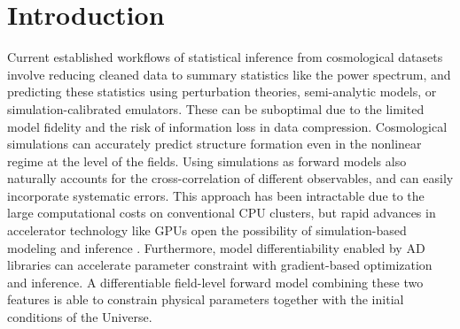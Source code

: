 \documentclass[modern, dvipsnames]{aastex631}
\newcommand{\pmwd}{{\usefont{T1}{nova}{m}{sl}pmwd}}
\begin{document}
\begin{abstract}

Rapid advances in deep learning have brought not only myriad powerful
neural networks, but also breakthroughs that benefit established
scientific research.
In particular, automatic differentiation (AD) tools and computational
accelerators like GPUs have facilitated forward modeling of the Universe
with differentiable simulations.
Based on analytic or automatic backpropagation, current differentiable
cosmological simulations are limited by memory, and thus are subject to
a trade-off between time and space/mass resolution, usually sacrificing
both.
We present a new approach free of such constraints, using the adjoint
method and reverse time integration.
It enables larger and more accurate forward modeling at the field level,
and will improve gradient based optimization and inference.
We implement it in an open-source particle-mesh (PM) $N$-body library
\pmwd\ (particle-mesh with derivatives).
Based on the powerful AD system \texttt{JAX}, \pmwd\ is fully
differentiable, and is highly performant on GPUs.

\end{abstract}



\vspace{1em}
\section{Introduction}

Current established workflows of statistical inference from cosmological
datasets involve reducing cleaned data to summary statistics like the
power spectrum, and predicting these statistics using perturbation
theories, semi-analytic models, or simulation-calibrated emulators.
These can be suboptimal due to the limited model fidelity and the
risk of information loss in data compression.
Cosmological simulations \citep{HockneyEastwood1988, AnguloHahn2022} can
accurately predict structure formation even in the nonlinear regime at
the level of the fields.
Using simulations as forward models also naturally accounts for the
cross-correlation of different observables, and can easily incorporate
systematic errors.
This approach has been intractable due to the large computational costs
on conventional CPU clusters, but rapid advances in accelerator
technology like GPUs open the possibility of simulation-based modeling
and inference \citep{CranmerEtAl2020}.
Furthermore, model differentiability enabled by AD libraries can
accelerate parameter constraint with gradient-based optimization and
inference.
A differentiable field-level forward model combining these two features
is able to constrain physical parameters together with the initial
conditions of the Universe.
\end{document}
